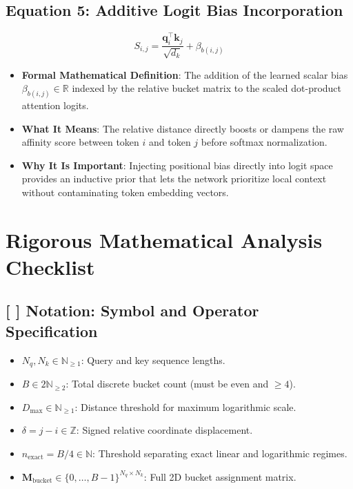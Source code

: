 \documentclass[11pt,a4paper]{article}
\theoremstyle{definition}
\begin{document}
\subsection{\textbf{Equation 5: Additive Logit Bias Incorporation}}
{\boldmath
\begin{equation}
S_{i, j} = \frac{\mathbf{q}_i^\top \mathbf{k}_j}{\sqrt{d_k}} + \beta_{b(i, j)}
\end{equation}
}
\begin{itemize}
    \item \textbf{Formal Mathematical Definition}:
    The addition of the learned scalar bias $\beta_{b(i, j)} \in \mathbb{R}$ indexed by the relative bucket matrix to the scaled dot-product attention logits.
    \item \textbf{What It Means}:
    The relative distance directly boosts or dampens the raw affinity score between token $i$ and token $j$ before softmax normalization.
    \item \textbf{Why It Is Important}:
    Injecting positional bias directly into logit space provides an inductive prior that lets the network prioritize local context without contaminating token embedding vectors.
\end{itemize}

\section{Rigorous Mathematical Analysis Checklist}

\subsection{[ ] Notation: Symbol and Operator Specification}
\begin{itemize}
    \item $N_q, N_k \in \mathbb{N}_{\ge 1}$: Query and key sequence lengths.
    \item $B \in 2\mathbb{N}_{\ge 2}$: Total discrete bucket count (must be even and $\ge 4$).
    \item $D_{\text{max}} \in \mathbb{N}_{\ge 1}$: Distance threshold for maximum logarithmic scale.
    \item $\delta = j - i \in \mathbb{Z}$: Signed relative coordinate displacement.
    \item $n_{\text{exact}} = B/4 \in \mathbb{N}$: Threshold separating exact linear and logarithmic regimes.
    \item $\mathbf{M}_{\text{bucket}} \in \{0, \dots, B-1\}^{N_q \times N_k}$: Full 2D bucket assignment matrix.
\end{itemize}
\end{document}
